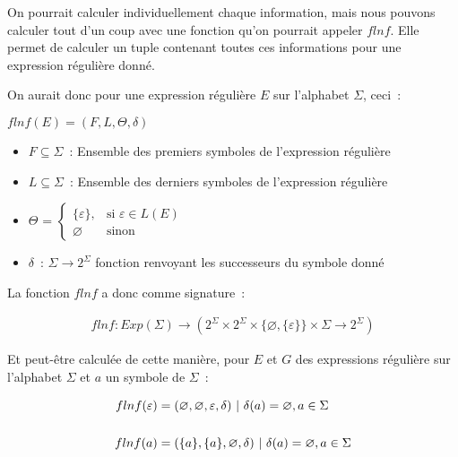 On pourrait calculer individuellement chaque information, mais nous pouvons
calculer tout d'un coup avec une fonction qu'on pourrait appeler \(flnf\). Elle
permet de calculer un tuple contenant toutes ces informations pour une
expression régulière donné.

\vphantom{}

On aurait donc pour une expression régulière \(E\) sur l'alphabet \(\Sigma\),
ceci~:

\begin{center}
    \(flnf(E) = (F, L, \Theta, \delta)\)

    \begin{itemize}
        \item[\textbullet] \(F \subseteq \Sigma\)~: Ensemble des premiers
            symboles de l'expression régulière

            \vphantom{}

        \item[\textbullet] \(L \subseteq \Sigma\)~: Ensemble des derniers
            symboles de l'expression régulière

            \vphantom{}

        \item[\textbullet] \(\Theta\) =
            \(
            \begin{cases}
                \{ \varepsilon \}, & \text{si } \varepsilon \in L(E) \\
                \varnothing        & \text{sinon}
            \end{cases}
            \)

            \vphantom{}

        \item[\textbullet] \(\delta\)~: \(\Sigma \to 2^{\Sigma}\) fonction
            renvoyant les successeurs du symbole donné
    \end{itemize}
\end{center}

La fonction \(flnf\) a donc comme signature~:

\begin{align*}
    flnf: Exp(\Sigma) \to (2^{\Sigma} \times 2^{\Sigma} \times
    \{\varnothing,\{\varepsilon\}\} \times \Sigma \to 2^{\Sigma})
\end{align*}

Et peut-être calculée de cette manière, pour \(E\) et \(G\) des expressions
régulière sur l'alphabet \(\Sigma\) et \(a\) un symbole de \(\Sigma\)~:

\begin{align*}
    flnf(\varepsilon) & = (\varnothing, \varnothing, \varepsilon, \delta) ~|~
    \delta(a) = \varnothing, a \in \Sigma                                     \\
    \vphantom{} \notag                                                        \\
    flnf(a) & = (\{a\}, \{a\}, \varnothing, \delta) ~|~ \delta(a) =
    \varnothing, a \in \Sigma
\end{align*}

